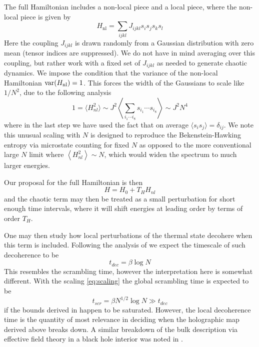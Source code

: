 \documentclass{brownthesis}
\DeclareMathOperator{\var}{var}
\begin{document}
The full Hamiltonian includes a non-local piece and a local piece,
where the non-local piece is given by
\begin{equation}
H_{\textrm{nl}}=\sum_{ijkl}J_{ijkl}s_{i}s_{j}s_{k}s_{l}\label{eq:nonlocalham}
\end{equation}
Here the coupling $J_{ijkl}$ is drawn randomly from a Gaussian distribution
with zero mean (tensor indices are suppressed). We do not have in
mind averaging over this coupling, but rather work with a fixed set
of $J_{ijkl}$ as needed to generate chaotic dynamics. We impose the
condition that the variance of the non-local Hamiltonian $\var(H_{{\rm nl}})=1$.
This forces the width of the Gaussians to scale like $1/N^{2}$, due
to the following analysis
\begin{equation}
1=\langle H_{nl}^{2}\rangle\sim J^{2}\left\langle \sum_{i_{1}\cdots i_{8}}s_{i_{1}}\cdots s_{i_{8}}\right\rangle \sim J^{2}N^{4}\label{eq:scaling}
\end{equation}
where in the last step we have used the fact that on average $\langle s_{i}s_{j}\rangle=\delta_{ij}$.
We note this unusual scaling with $N$ is designed to reproduce the
Bekenstein-Hawking entropy via microstate counting for fixed $N$
as opposed to the more conventional large $N$ limit where $\left\langle H_{nl}^{2}\right\rangle \sim N$,
which would widen the spectrum to much larger energies.

Our proposal for the full Hamiltonian is then
\begin{equation}
H=H_{0}+T_{H}H_{nl}\label{eq:hamiltonian}
\end{equation}
and the chaotic term may then be treated as a small perturbation for
short enough time intervals, where it will shift energies at leading
order by terms of order $T_{H}$.

One may then study how local perturbations of the thermal state decohere
when this term is included. Following the analysis of \cite{Lowe:2019scv}
we expect the timescale of such decoherence to be
\begin{equation}
t_{dec}=\beta\log N\label{eq:deco}
\end{equation}
This resembles the scrambling time, however the interpretation here
is somewhat different. With the scaling \eqref{eq:scaling} the global
scrambling time is expected to be
\[
t_{scr}=\beta N^{1/2}\log N\gg t_{dec}
\]
if the bounds derived in \cite{Bentsen:2018uph} happen to be saturated.
However, the local decoherence time is the quantity of most relevance
in deciding when the holographic map derived above breaks down. A
similar breakdown of the bulk description via effective field theory
in a black hole interior was noted in \cite{Lowe:2015eba,Lowe:2016mhi,Lowe:2017ehz}.
\end{document}
